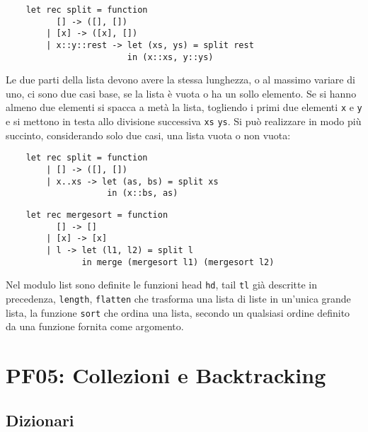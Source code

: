 \documentclass{article}
\numberwithin{equation}{subsection}
\begin{document}
\begin{verbatim}
    let rec split = function
          [] -> ([], [])
        | [x] -> ([x], [])
        | x::y::rest -> let (xs, ys) = split rest
                        in (x::xs, y::ys)
\end{verbatim}
Le due parti della lista devono avere la stessa lunghezza, o al massimo variare di uno, ci sono due casi base, se la lista è vuota o ha un sollo elemento. Se si hanno almeno due elementi si spacca a metà la lista, togliendo i primi due elementi \verb|x| e \verb|y| e si mettono in testa allo divisione successiva \verb|xs| \verb|ys|. 
Si può realizzare in modo più succinto, considerando solo due casi, una lista vuota o non vuota:
\begin{verbatim}
    let rec split = function
        | [] -> ([], [])
        | x..xs -> let (as, bs) = split xs
                    in (x::bs, as)
\end{verbatim}

\begin{verbatim}
    let rec mergesort = function
          [] -> []
        | [x] -> [x]
        | l -> let (l1, l2) = split l
               in merge (mergesort l1) (mergesort l2)
\end{verbatim}
Nel modulo list sono definite le funzioni head \verb|hd|, tail \verb|tl| già descritte in precedenza, \verb|length|, \verb|flatten| che trasforma una lista di liste in un'unica grande lista, la funzione \verb|sort| che ordina una lista, secondo un qualsiasi ordine definito da una funzione fornita come argomento. 

\clearpage

\section{PF05: Collezioni e Backtracking}


\subsection{Dizionari}
\end{document}
